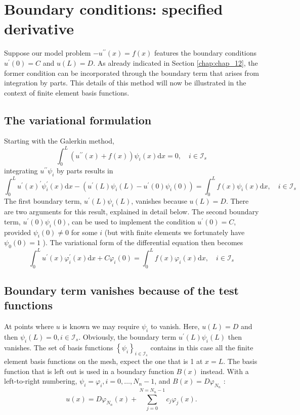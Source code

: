 \documentclass[../main.tex]{subfiles}
\begin{document}
	\chapter{Boundary conditions: specified derivative}
\label{chap:chap_15}

\noindent Suppose our model problem $-u^{\prime \prime}(x)=f(x)$ features the boundary conditions $u^{\prime}(0)=C$ and $u(L)=D$. As already indicated in Section \ref{chap:chap_12}, the former condition can be incorporated through the boundary term that arises from integration by parts. This details of this method will now be illustrated in the context of finite element basis functions.
	\section[Boundary conditions: specified derivative]{The variational formulation}
		\label{sec:sec_15_1}
		\noindent Starting with the Galerkin method,
		$$
		\int_{0}^{L}\left(u^{\prime \prime}(x)+f(x)\right) \psi_{i}(x) \mathrm{d} x=0, \quad i \in \mathcal{I}_{s}
		$$
		integrating $u^{\prime \prime} \psi_{i}$ by parts results in
		$$
		\int_{0}^{L} u^{\prime}(x)^{\prime} \psi_{i}^{\prime}(x) \mathrm{d} x-\left(u^{\prime}(L) \psi_{i}(L)-u^{\prime}(0) \psi_{i}(0)\right)=\int_{0}^{L} f(x) \psi_{i}(x) \mathrm{d} x, \quad i \in \mathcal{I}_{s}
		$$\smallbreak
		The first boundary term, $u^{\prime}(L) \psi_{i}(L)$, vanishes because $u(L)=D$. There are two arguments for this result, explained in detail below. The second boundary term, $u^{\prime}(0) \psi_{i}(0)$, can be used to implement the condition $u^{\prime}(0)=C$, provided $\psi_{i}(0) \neq 0$ for some $i$ (but with finite elements we fortunately have $\psi_{0}(0)=1$ ). The variational form of the differential equation then becomes
		$$
		\int_{0}^{L} u^{\prime}(x) \varphi_{i}^{\prime}(x) \mathrm{d} x+C \varphi_{i}(0)=\int_{0}^{L} f(x) \varphi_{i}(x) \mathrm{d} x, \quad i \in \mathcal{I}_{s}
		$$
		\bigbreak
		
	\section[Boundary conditions: specified derivative]{Boundary term vanishes because of the test functions}
		\label{sec:sec_15_2}
		\noindent At points where $u$ is known we may require $\psi_{i}$ to vanish. Here, $u(L)=D$ and then $\psi_{i}(L)=0, i \in \mathcal{I}_{s}$. Obviously, the boundary term $u^{\prime}(L) \psi_{i}(L)$ then vanishes.\smallbreak
		The set of basis functions $\left\{\psi_{i}\right\}_{i \in \mathcal{I}_{s}}$ contains in this case all the finite element basis functions on the mesh, expect the one that is 1 at $x=L$.
		The basis function that is left out is used in a boundary function $B(x)$ instead. With a left-to-right numbering, $\psi_{i}=\varphi_{i}, i=0, \ldots, N_{n}-1$, and $B(x)=D \varphi_{N_{n}}$ :
		$$
		u(x)=D \varphi_{N_{n}}(x)+\sum_{j=0}^{N=N_{n}-1} c_{j} \varphi_{j}(x) .
		$$
		
\end{document}
